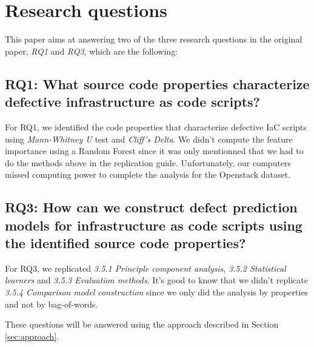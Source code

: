 
\section{Research questions}
\label{sec:research-questions}
This paper aims at answering two of the three research questions in the original paper, \textit{RQ1} and \textit{RQ3}, which are the following:
\subsection{RQ1: What source code properties characterize defective infrastructure as code scripts?}
For RQ1, we identified the code properties that characterize defective IaC scripts
using \emph{Mann-Whitney U} test and \emph{Cliff's Delta}. We didn't 
compute the feature importance using a Random Forest since it was only mentionned 
that we had to do the methods above in the replication guide. Unfortunately, 
our computers missed computing power to complete the analysis for the Openstack 
dataset.
\subsection{RQ3: How can we construct defect prediction models for 
infrastructure as code scripts using the identified source code properties?}
For RQ3, we replicated \emph{3.5.1 Principle component analysis},  
\emph{3.5.2 Statistical learners} and \emph{3.5.3 Evaluation methods}. It's good 
to know that we didn't replicate \emph{3.5.4 Comparison model construction} since 
we only did the analysis by properties and not by bag-of-words.

These questions will be answered using the approach described in Section \ref{sec:approach}.
